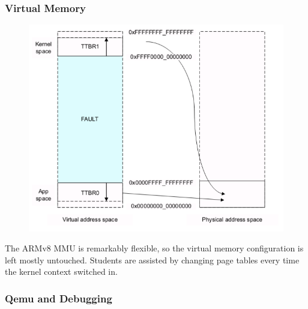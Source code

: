 \documentclass[table,xcdraw]{beamer}
\begin{document}
\begin{frame}
    \frametitle{Virtual Memory}
    \vspace{-2cm}
    \begin{figure}
        \includegraphics[scale=0.35]{ttbr.png}
    \end{figure}
    The ARMv8 MMU is remarkably flexible, so the virtual memory configuration is left
    mostly untouched.
    Students are assisted by changing page tables every time the kernel context
    switched in.
\end{frame}

\begin{frame}[plain]
    \frametitle{Qemu and Debugging}
\end{frame}
\end{document}
